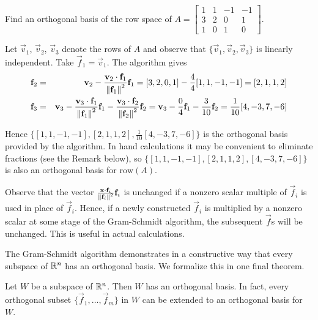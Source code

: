 \documentclass{ximera}
\begin{document}
\begin{example}\label{exa:023743}
Find an orthogonal basis of the row space of $A = \begin{bmatrix}
1 & 1 & -1 & -1\\
3 & 2 & 0 & 1\\
1 & 0 & 1 & 0
\end{bmatrix}$.

\begin{explanation}
  Let $\vec{v}_{1}$, $\vec{v}_{2}$, $\vec{v}_{3}$ denote the rows of $A$ and observe that $\{\vec{v}_{1}, \vec{v}_{2}, \vec{v}_{3}\}$ is linearly independent. Take $\vec{f}_{1} = \vec{v}_{1}$. The algorithm gives
\begin{eqnarray*}
\mathbf{f}_{2} &=& \mathbf{v}_{2} - \frac{\mathbf{v}_{2} \cdot \mathbf{f}_{1}}{\left\lVert\mathbf{f}_{1}\right\rVert^2}\mathbf{f}_{1} = [3, 2, 0, 1] - \frac{4}{4}[1, 1, -1, -1] = [2, 1, 1, 2] \\
\mathbf{f}_{3} &=& \mathbf{v}_{3} - \frac{\mathbf{v}_{3} \cdot \mathbf{f}_{1}}{\left\lVert\mathbf{f}_{1}\right\rVert^2}\mathbf{f}_{1} - \frac{\mathbf{v}_{3} \cdot \mathbf{f}_{2}}{\left\lVert\mathbf{f}_{2}\right\rVert^2}\mathbf{f}_{2} = \mathbf{v}_{3} - \frac{0}{4}\mathbf{f}_{1} - \frac{3}{10}\mathbf{f}_{2} = \frac{1}{10}[4, -3, 7, -6]
\end{eqnarray*}

Hence $\{[1, 1, -1, -1], [2, 1, 1, 2], \frac{1}{10}[4, -3, 7, -6]\}$ is the orthogonal basis provided by the algorithm. In
hand calculations it may be convenient to eliminate fractions (see the Remark below), so $\{[1, 1, -1, -1], [2, 1, 1, 2], [4, -3, 7, -6]\}$ is also an orthogonal basis for $\mbox{row}(A)$.
\end{explanation}
\end{example}

\begin{remark}\label{rem:scalarMultGS}
Observe that the vector $\frac{\mathbf{x} \cdot \mathbf{f}_{i}}{\left\lVert\mathbf{f}_{i}\right\rVert^2}\mathbf{f}_{i}$
 is unchanged if a nonzero scalar multiple of $\vec{f}_{i}$ is used in place of $\vec{f}_{i}$. Hence, if a newly constructed $\vec{f}_{i}$ is multiplied by a nonzero scalar at some stage of the Gram-Schmidt algorithm, the subsequent $\vec{f}$s will be unchanged. This is useful in actual calculations.
 \end{remark}

The Gram-Schmidt algorithm demonstrates in a constructive way that every subspace of $\mathbb{R}^n$ has an orthogonal basis.  We formalize this in one final theorem.

\begin{theorem}\label{023635}
Let $W$ be a subspace of $\mathbb{R}^n$.  Then  $W$ has an orthogonal basis.  In fact, every orthogonal subset $\{\vec{f}_{1}, \dots , \vec{f}_{m}\}$ in $W$ can be extended to an orthogonal basis for $W$.
\end{theorem}
\end{document}
